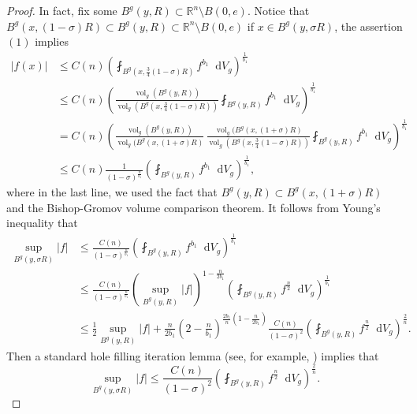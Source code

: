 \documentclass[12pt]{amsart}
\theoremstyle{plain}
\theoremstyle{definition}
\theoremstyle{remark}     %
\numberwithin{equation}{section}
\newcommand{\dd}{\mathop{}\!\mathrm{d}}%
\begin{document}
\begin{proof}
    In fact, fix some $B^g(y,R)\subset \mathbb{R}^n\setminus B(0,e)$. Notice that $B^g(x,(1-\sigma)R)\subset B^g(y,R)\subset \mathbb{R}^n\setminus B(0,e)$ if $x\in B^g(y,\sigma R)$, the assertion $(1)$ implies
    \begin{align*}
        |f(x)|&\leq C(n) \left(
            \fint_{B^g(x,\frac{3}{4}(1-\sigma)R)}f^{b_1}\dd V_g
            \right)^{\frac{1}{b_1}}\\
            &\leq C(n)\left(
            \frac{\operatorname{vol}_g(B^g(y,R))}{\operatorname{vol}_g(B^g(x,\frac{3}{4}(1-\sigma)R))}
            \fint_{B^g(y,R)}f^{b_1}\dd V_g
            \right)^{\frac{1}{b_1}}\\
            &=C(n)\left(
            \frac{\operatorname{vol}_g(B^g(y,R))}{\operatorname{vol}_g(B^g(x,(1+\sigma)R)}\,
            \frac{\operatorname{vol}_g(B^g(x,(1+\sigma)R)}{\operatorname{vol}_g(B^g(x,\frac{3}{4}(1-\sigma)R))}
            \fint_{B^g(y,R)}f^{b_1}\dd V_g
            \right)^{\frac{1}{b_1}}\\
            &\leq C(n)\frac{1}{(1-\sigma)^{\frac{n}{b_1}}}\left(
            \fint_{B^g(y,R)}f^{b_1}\dd V_g
            \right)^{\frac{1}{b_1}},
    \end{align*}
    where in the last line, we used the fact that $B^g(y,R)\subset B^g(x,(1+\sigma)R)$ and the Bishop-Gromov volume comparison theorem.
    It follows from Young's inequality that
    \begin{align*}
        \sup _{B^g(y,\sigma R)}|f|
        &\leq \frac{C(n)}{(1-\sigma)^{\frac{n}{b_1}}} \left(
            \fint_{B^g(y,R)}f^{b_1}\dd V_g
        \right)^{\frac{1}{b_1}}\\
        &\leq \frac{C(n)}{(1-\sigma)^{\frac{n}{b_1}}}
        (\sup_{B^g(y,R)}|f|)^{1-\frac{n}{2b_1}}
        \left(
            \fint_{B^g(y,R)}f^{\frac{n}{2}}\dd V_g
        \right)^{\frac{1}{b_1}}\\
        &\leq \frac{1}{2}\sup_{B^g(y,R)} |f|
        +\frac{n}{2b_1}
        \left(2-\frac{n}{b_1}\right)
        ^{\frac{2b_1}{n}(1-\frac{n}{2b_1})}
        \frac{C(n)}{(1-\sigma)^2}
        \left(
            \fint_{B^g(y,R)}f^{\frac{n}{2}}\dd V_g
        \right)^{\frac{2}{n}}.
    \end{align*}
    Then a standard hole filling iteration lemma (see, for example, \cite[Lemma 3]{BC}) implies that 
    \[
        \sup_{B^g(y,\sigma R)}|f|\leq \frac{C(n)}{(1-\sigma)^2}
        \left(
            \fint_{B^g(y,R)}f^{\frac{n}{2}}\dd V_g
        \right)^{\frac{2}{n}}.
    \]
\end{proof}
\end{document}

